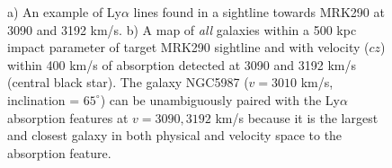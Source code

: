 \documentclass[iop]{emulateapj-rtx4}
\begin{document}
\begin{figure}[ht!]
\centering
  \caption{\small{a) An example of Ly$\alpha$ lines found in a sightline towards MRK290 at 3090 and 3192 km/s. b) A map of \textit{all} galaxies within a 500 kpc impact parameter of target MRK290 sightline and with velocity ($cz$) within 400 km/s of absorption detected at 3090 and 3192 km/s (central black star). The galaxy NGC5987 ($v=3010$ km/s, inclination = $65^{\circ}$) can be unambiguously paired with the Ly$\alpha$ absorption features at $v=3090, 3192$ km/s because it is the largest and closest galaxy in both physical and velocity space to the absorption feature.}}
\vspace{5pt}
\end{figure}
\end{document}
